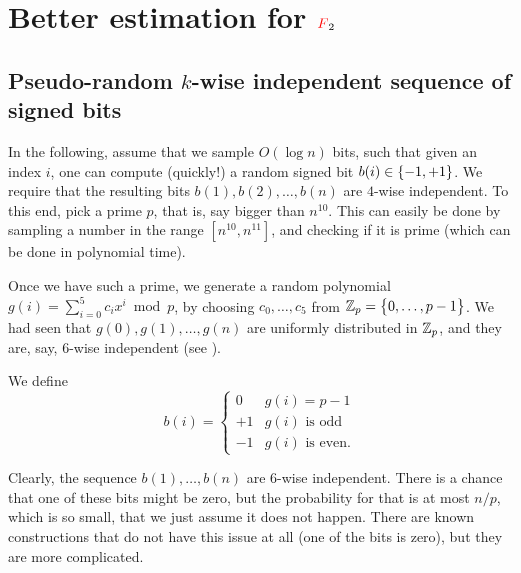 


\section{Better estimation for ${\textcolor{red}{F}}_2$}

\subsection{Pseudo-random $k$-wise independent %
   sequence of signed bits}

In the following, assume that we sample $O( \log n)$ bits, such that
given an index $i$, one can compute (quickly!) a random signed bit
$b(i) \in \left\{ {-1,+1} \right\}$. We require that the resulting bits
$b(1), b(2), \ldots, b(n)$ are $4$-wise independent.  To this end,
pick a prime $p$, that is, say bigger than $n^{10}$. This can easily
be done by sampling a number in the range $[n^{10}, n^{11}]$, and
checking if it is prime (which can be done in polynomial time).

Once we have such a prime, we generate a random polynomial
$g(i) = \sum_{i=0}^5 c_i x^i \bmod p$, by choosing $c_0, \ldots, c_5$
from $\mathbb{Z}_p = \left\{ {0, \ldots, p-1 \bigl. } \right\}$.  We had seen that
$g(0), g(1), \ldots, g(n)$ are uniformly distributed in $\mathbb{Z}_p$, and
they are, say, $6$-wise independent (see ).


We define
\begin{equation*}
    b(i)%
    =%
    \begin{cases}
        0 & g(i) = p-1 \\
        +1 & g(i) \text{ is odd}\\
        -1 & g(i) \text{ is even}.
    \end{cases}
\end{equation*}

Clearly, the sequence $b(1), \ldots, b(n)$ are $6$-wise
independent. There is a chance that one of these bits might be zero,
but the probability for that is at most $n/p$, which is so small, that
we just assume it does not happen. There are known constructions that
do not have this issue at all (one of the bits is zero), but they are
more complicated.

